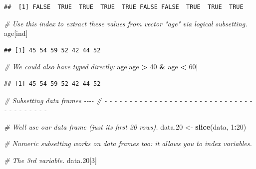 \documentclass[
]{book}
\newenvironment{Shaded}{\begin{snugshade}}{\end{snugshade}}
\newcommand{\CommentTok}[1]{\textcolor[rgb]{0.56,0.35,0.01}{\textit{#1}}}
\newcommand{\DecValTok}[1]{\textcolor[rgb]{0.00,0.00,0.81}{#1}}
\newcommand{\FloatTok}[1]{\textcolor[rgb]{0.00,0.00,0.81}{#1}}
\newcommand{\FunctionTok}[1]{\textcolor[rgb]{0.13,0.29,0.53}{\textbf{#1}}}
\newcommand{\NormalTok}[1]{#1}
\newcommand{\OtherTok}[1]{\textcolor[rgb]{0.56,0.35,0.01}{#1}}
\newcommand{\SpecialCharTok}[1]{\textcolor[rgb]{0.81,0.36,0.00}{\textbf{#1}}}
\begin{document}
\begin{verbatim}
##  [1] FALSE  TRUE  TRUE  TRUE  TRUE FALSE FALSE  TRUE  TRUE  TRUE
\end{verbatim}

\begin{Shaded}
\begin{Highlighting}[]
\CommentTok{\# Use this index to extract these values from vector "age" via logical subsetting.}
\NormalTok{age[ind]}
\end{Highlighting}
\end{Shaded}

\begin{verbatim}
## [1] 45 54 59 52 42 44 52
\end{verbatim}

\begin{Shaded}
\begin{Highlighting}[]
\CommentTok{\# We could also have typed directly:}
\NormalTok{age[age }\SpecialCharTok{\textgreater{}} \DecValTok{40} \SpecialCharTok{\&}\NormalTok{ age }\SpecialCharTok{\textless{}} \DecValTok{60}\NormalTok{]}
\end{Highlighting}
\end{Shaded}

\begin{verbatim}
## [1] 45 54 59 52 42 44 52
\end{verbatim}

\begin{Shaded}
\begin{Highlighting}[]
\CommentTok{\# Subsetting data frames                                                     {-}{-}{-}{-} }
\CommentTok{\# {-} {-} {-} {-} {-} {-} {-} {-} {-} {-} {-} {-} {-} {-} {-} {-} {-} {-} {-} {-} {-} {-} {-} {-} {-} {-} {-} {-} {-} {-} {-} {-} {-} {-} {-} {-} {-} {-} {-} }

\CommentTok{\# We\textquotesingle{}ll use our data frame (just its first 20 rows).}
\NormalTok{data}\FloatTok{.20} \OtherTok{\textless{}{-}} \FunctionTok{slice}\NormalTok{(data, }\DecValTok{1}\SpecialCharTok{:}\DecValTok{20}\NormalTok{)}

\CommentTok{\# Numeric subsetting works on data frames too: it allows you to index variables.}

\CommentTok{\# The 3rd variable.}
\NormalTok{data}\FloatTok{.20}\NormalTok{[}\DecValTok{3}\NormalTok{]}
\end{Highlighting}
\end{Shaded}
\end{document}
